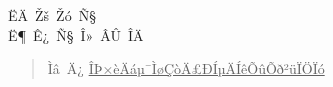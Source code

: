 \documentclass[12pt,openany,CJK,oneside]{cctbook}
\begin{document}
\begin{titlepage}
\vspace{5cm}
\begin{center}{\Huge \biaosong ËÄ\ Žš\ Žó\ Ñ§\\
\vspace{1.2cm} Ë¶\ Ê¿\ Ñ§\ Î»\ ÂÛ\ ÎÄ}\end{center}


\vspace{2.3cm}
\begin{quote}
{\Large {\fangsong \hspace{0.25cm}Ìâ\ Ä¿}\hspace{0.15cm}
\underline{{\kaishu \hspace{0.85cm} ÎÞ×èÄáµ¯ÌøÇòÄ£ÐÍµÄÍêÕûÕð²üÏÖÏó \hspace{0.85cm}}} }
\end{quote}

\vspace{0.8cm}


\end{titlepage}
\end{document}
